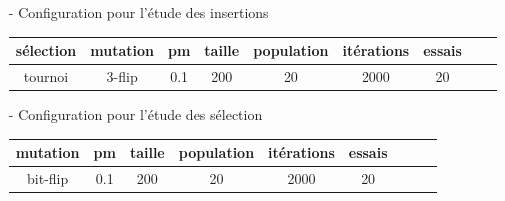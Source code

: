 \documentclass{article}
\begin{document}
\begin{itemize}
    \item[-] Configuration pour l'étude des insertions
    
    \begin{tabular}{|c|c|c|c|c|c|c|c|c|}
     \hline
    sélection &  mutation & pm & taille & population & itérations & essais \\
    \hline
    tournoi  & 3-flip & 0.1 & 200 & 20 & 2000 & 20\\
    \hline
    \end{tabular}

    \item[-] Configuration pour l'étude des sélection
    
    \begin{tabular}{|c|c|c|c|c|c|c|c|c|}
     \hline
    mutation & pm & taille &  population & itérations & essais \\
    \hline
    bit-flip & 0.1 & 200 & 20 & 2000 & 20\\
    \hline
    \end{tabular}
        
\end{itemize}
\end{document}
